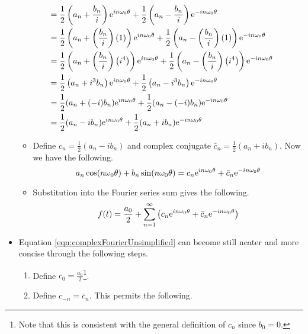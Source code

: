 \documentclass{article}
\begin{document}
\begin{itemize}
\begin{align*}
        &= \frac{1}{2}\left( a_n+\frac{b_n}{i} \right)\e[in\omega_0\theta] + \frac{1}{2}\left( a_n-\frac{b_n}{i} \right)\e[-in\omega_0\theta]\\
        &= \frac{1}{2}\left( a_n+\left( \frac{b_n}{i} \right)(1) \right)\e[in\omega_0\theta] + \frac{1}{2}\left( a_n-\left( \frac{b_n}{i} \right)(1) \right)\e[-in\omega_0\theta]\\
        &= \frac{1}{2}\left( a_n+\left( \frac{b_n}{i} \right)\left( i^4 \right) \right)\e[in\omega_0\theta] + \frac{1}{2}\left( a_n-\left( \frac{b_n}{i} \right)\left( i^4 \right) \right)\e[-in\omega_0\theta]\\
        &= \frac{1}{2}\left( a_n+i^3b_n \right)\e[in\omega_0\theta] + \frac{1}{2}\left( a_n-i^3b_n \right)\e[-in\omega_0\theta]\\
        &= \frac{1}{2}(a_n+(-i)b_n)\e[in\omega_0\theta] + \frac{1}{2}(a_n-(-i)b_n)\e[-in\omega_0\theta]\\
        &= \frac{1}{2}(a_n-ib_n)\e[in\omega_0\theta]+\frac{1}{2}(a_n+ib_n)\e[-in\omega_0\theta]
    \end{align*}
    \begin{itemize}
        \item Define $c_n = \frac{1}{2}\left( a_n-ib_n \right)$ and complex conjugate $\bar{c}_n = \frac{1}{2}\left( a_n+ib_n \right)$. Now we have the following.
        \begin{equation*}
            a_n\cos(n\omega_0\theta)+b_n\sin(n\omega_0\theta) = c_n\e[in\omega_0\theta]+\bar{c}_n\e[-in\omega_0\theta]
        \end{equation*}
        \item Substitution into the Fourier series sum gives the following.
        \begin{equation}\label{eqn:complexFourierUnsimplified}
            f(t) = \frac{a_0}{2}+\sum_{n=1}^\infty\left( c_n\e[in\omega_0\theta]+\bar{c}_n\e[-in\omega_0\theta] \right)
        \end{equation}
    \end{itemize}
    \item Equation \ref{eqn:complexFourierUnsimplified} can become still neater and more concise through the following steps.
    \begin{enumerate}
        \item Define $c_0=\frac{a_0}{2}$\footnote{Note that this is consistent with the general definition of $c_n$ since $b_0=0$.}.
        \item Define $c_{-n} = \bar{c}_n$. This permits the following.

\end{enumerate}
\end{itemize}
\end{document}
